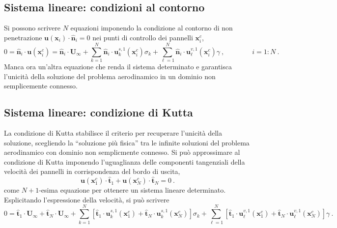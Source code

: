 \subsection{Sistema lineare: condizioni al contorno}
Si possono scrivere $N$ equazioni imponendo la condizione al contorno di non penetrazione $\bm{u}(\bm{x}_i) \cdot \bm{\hat{n}}_i = 0$ nei punti di controllo dei pannelli $\bm{x}^c_i$,
\begin{equation}
 0 = \bm{\hat{n}}_i \cdot \bm{u}(\bm{x}^c_i) = \bm{\hat{n}}_i \cdot \bm{U}_{\infty}
  + \displaystyle\sum_{k=1}^{N}\bm{\hat{n}}_i \cdot \bm{u}^{s,1}_k(\bm{x}^c_i) \sigma_k 
  + \displaystyle\sum_{\ell=1}^{N}\bm{\hat{n}}_i \cdot \bm{u}^{v,1}_{\ell}(\bm{x}^c_i) \gamma \ , \qquad\qquad i=1:N \ .
\end{equation}
Manca ora un'altra equazione che renda il sistema determinato e garantisca l'unicità della soluzione del problema aerodinamico in un dominio non semplicemente connesso.

\subsection{Sistema lineare: condizione di Kutta}
La condizione di Kutta stabilisce il criterio per recuperare l'unicità della soluzione, scegliendo la ``soluzione più fisica'' tra le infinite soluzioni del problema aerodinamico con dominio non semplicmente connesso.\newline
Si può approssimare al condizione di Kutta imponendo l'uguaglianza delle componenti tangenziali della velocità dei pannelli in corrispondenza del bordo di uscita,
\begin{equation}
 \bm{u}(\bm{x}^c_1) \cdot \bm{\hat{t}}_1 +
 \bm{u}(\bm{x}^c_N) \cdot \bm{\hat{t}}_N = 0 \ .
\end{equation}
come $N+1$-esima equazione per ottenere un sistema lineare determinato. Esplicitando l'espressione della velocità, si può scrivere
\begin{equation}
 0 = \bm{\hat{t}}_1 \cdot \bm{U}_{\infty} + 
     \bm{\hat{t}}_N \cdot \bm{U}_{\infty} + 
 \displaystyle\sum_{k=1}^{N} \left[ \bm{\hat{t}}_1 \cdot \bm{u}^{s,1}_k(\bm{x}^c_1) + 
   \bm{\hat{t}}_N \cdot \bm{u}^{s,1}_k(\bm{x}^c_N) \right] \sigma_k +
 \displaystyle\sum_{\ell=1}^N \left[\bm{\hat{t}}_1 \cdot \bm{u}^{v,1}_{\ell}(\bm{x}^c_1) +
   \bm{\hat{t}}_N \cdot \bm{u}^{v,1}_{\ell}(\bm{x}^c_N) \right] \gamma \ .
\end{equation}


